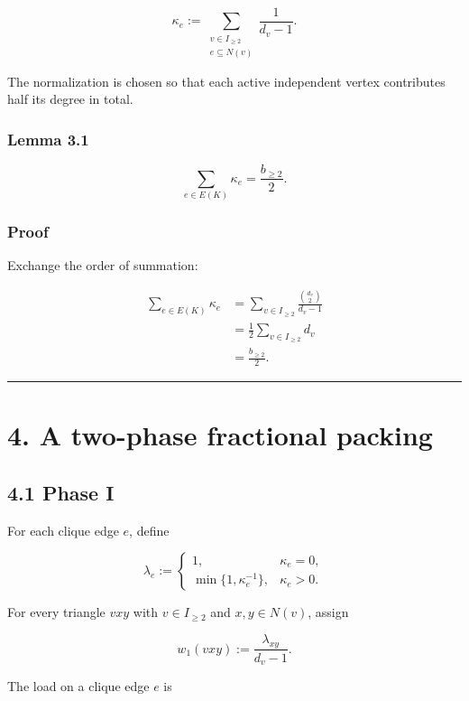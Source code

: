 \documentclass[
  11pt,
]{article}
\begin{document}
\[
\kappa_e
:=
\sum_{\substack{v\in I_{\ge2}\\ e\subseteq N(v)}}
\frac{1}{d_v-1}.
\tag{3.1}
\]

The normalization is chosen so that each active independent vertex
contributes half its degree in total.

\subsubsection{Lemma 3.1}\label{lemma-3.1}

\[
\sum_{e\in E(K)}\kappa_e
=
\frac{b_{\ge2}}2.
\]

\subsubsection{Proof}\label{proof}

Exchange the order of summation:

\[
\begin{aligned}
\sum_{e\in E(K)}\kappa_e
&=
\sum_{v\in I_{\ge2}}
\frac{\binom{d_v}{2}}{d_v-1}\\
&=
\frac12
\sum_{v\in I_{\ge2}}d_v\\
&=
\frac{b_{\ge2}}2.
\end{aligned}
\]

\begin{center}\rule{0.5\linewidth}{0.5pt}\end{center}

\section{4. A two-phase fractional
packing}\label{a-two-phase-fractional-packing}

\subsection{4.1 Phase I}\label{phase-i}

For each clique edge \(e\), define

\[
\lambda_e
:=
\begin{cases}
1,&\kappa_e=0,\\[1mm]
\min\{1,\kappa_e^{-1}\},&\kappa_e>0.
\end{cases}
\]

For every triangle \(vxy\) with \(v\in I_{\ge2}\) and \(x,y\in N(v)\),
assign

\[
w_1(vxy)
:=
\frac{\lambda_{xy}}{d_v-1}.
\tag{4.1}
\]

The load on a clique edge \(e\) is
\end{document}
